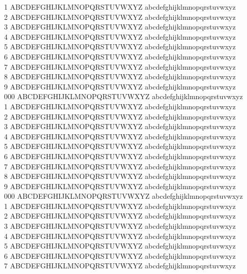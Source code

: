 \documentclass[doctor,english,final]{postech-ucs}
\begin{document}
1 ABCDEFGHIJKLMNOPQRSTUVWXYZ abcdefghijklmnopqrstuvwxyz \\
2 ABCDEFGHIJKLMNOPQRSTUVWXYZ abcdefghijklmnopqrstuvwxyz \\
3 ABCDEFGHIJKLMNOPQRSTUVWXYZ abcdefghijklmnopqrstuvwxyz \\
4 ABCDEFGHIJKLMNOPQRSTUVWXYZ abcdefghijklmnopqrstuvwxyz \\
5 ABCDEFGHIJKLMNOPQRSTUVWXYZ abcdefghijklmnopqrstuvwxyz \\
6 ABCDEFGHIJKLMNOPQRSTUVWXYZ abcdefghijklmnopqrstuvwxyz \\
7 ABCDEFGHIJKLMNOPQRSTUVWXYZ abcdefghijklmnopqrstuvwxyz \\
8 ABCDEFGHIJKLMNOPQRSTUVWXYZ abcdefghijklmnopqrstuvwxyz \\
9 ABCDEFGHIJKLMNOPQRSTUVWXYZ abcdefghijklmnopqrstuvwxyz \\
000 ABCDEFGHIJKLMNOPQRSTUVWXYZ abcdefghijklmnopqrstuvwxyz \\
1 ABCDEFGHIJKLMNOPQRSTUVWXYZ abcdefghijklmnopqrstuvwxyz \\
2 ABCDEFGHIJKLMNOPQRSTUVWXYZ abcdefghijklmnopqrstuvwxyz \\
3 ABCDEFGHIJKLMNOPQRSTUVWXYZ abcdefghijklmnopqrstuvwxyz \\
4 ABCDEFGHIJKLMNOPQRSTUVWXYZ abcdefghijklmnopqrstuvwxyz \\
5 ABCDEFGHIJKLMNOPQRSTUVWXYZ abcdefghijklmnopqrstuvwxyz \\
6 ABCDEFGHIJKLMNOPQRSTUVWXYZ abcdefghijklmnopqrstuvwxyz \\
7 ABCDEFGHIJKLMNOPQRSTUVWXYZ abcdefghijklmnopqrstuvwxyz \\
8 ABCDEFGHIJKLMNOPQRSTUVWXYZ abcdefghijklmnopqrstuvwxyz \\
9 ABCDEFGHIJKLMNOPQRSTUVWXYZ abcdefghijklmnopqrstuvwxyz \\
000 ABCDEFGHIJKLMNOPQRSTUVWXYZ abcdefghijklmnopqrstuvwxyz \\
1 ABCDEFGHIJKLMNOPQRSTUVWXYZ abcdefghijklmnopqrstuvwxyz \\
2 ABCDEFGHIJKLMNOPQRSTUVWXYZ abcdefghijklmnopqrstuvwxyz \\
3 ABCDEFGHIJKLMNOPQRSTUVWXYZ abcdefghijklmnopqrstuvwxyz \\
4 ABCDEFGHIJKLMNOPQRSTUVWXYZ abcdefghijklmnopqrstuvwxyz \\
5 ABCDEFGHIJKLMNOPQRSTUVWXYZ abcdefghijklmnopqrstuvwxyz \\
6 ABCDEFGHIJKLMNOPQRSTUVWXYZ abcdefghijklmnopqrstuvwxyz \\
7 ABCDEFGHIJKLMNOPQRSTUVWXYZ abcdefghijklmnopqrstuvwxyz \\
\end{document}
